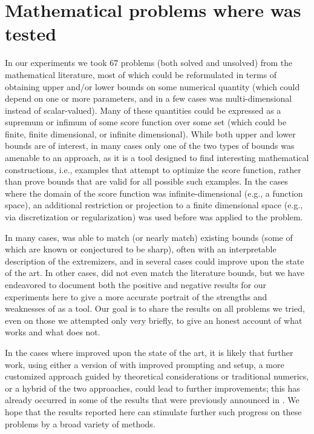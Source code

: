 \renewcommand{\thesubsection}{\arabic{subsection}}
\section{Mathematical problems where \AlphaEvolve was tested}\label{sec:problems}

In our experiments we took  $67$ problems (both solved and unsolved) from the mathematical literature, most of which could be reformulated in terms of obtaining upper and/or lower bounds on some numerical quantity (which could depend on one or more parameters, and in a few cases was multi-dimensional instead of scalar-valued).  Many of these quantities could be expressed as a supremum or infimum of some score function over some set (which could be finite, finite dimensional, or infinite dimensional).  While both upper and lower bounds are of interest, in many cases only one of the two types of bounds was amenable to an \AlphaEvolve approach, as it is a tool designed to find interesting mathematical constructions, i.e., examples that attempt to optimize the score function, rather than prove bounds that are valid for all possible such examples.  In the cases where the domain of the score function was infinite-dimensional (e.g., a function space), an additional restriction or projection to a finite dimensional space (e.g., via discretization or regularization) was used  before \AlphaEvolve was applied to the problem. 

In many cases, \AlphaEvolve was able to match (or nearly match) existing bounds (some of which are known or conjectured to be sharp), often with an interpretable description of the extremizers, and in several cases could improve upon the state of the art.  In other cases, \AlphaEvolve did not even match the literature bounds, but we have endeavored to document both the positive and negative results for our experiments here to give a more accurate portrait of the strengths and weaknesses of \AlphaEvolve as a tool. Our goal is to share the results on all problems we tried, even on those we attempted only very briefly, to give an honest account of what works and what does not.

In the cases where \AlphaEvolve improved upon the state of the art, it is likely that further work, using either a version of \AlphaEvolve with improved prompting and setup, a more customized approach guided by theoretical considerations or traditional numerics, or a hybrid of the two approaches, could lead to further improvements; this has already occurred in some of the \AlphaEvolve results that were previously announced in \cite{novikov2025alphaevolve}.  We hope that the results reported here can stimulate further such progress on these problems by a broad variety of methods.


